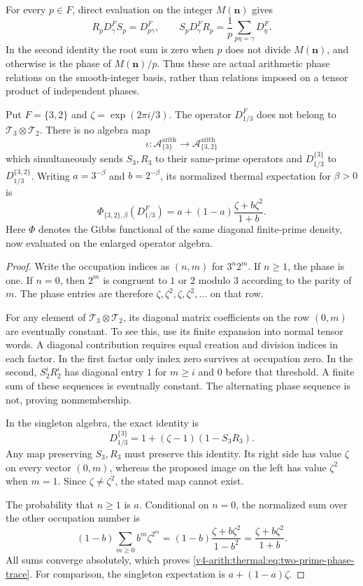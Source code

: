 For every $p\in F$, direct evaluation on the integer $M(\mathbf n)$
gives
\[
 R_pD^F_\gamma S_p=D^F_{p\gamma},\qquad
 S_pD^F_\gamma R_p=\frac1p\sum_{p\eta=\gamma}D^F_\eta.
\]
In the second identity the root sum is zero when $p$ does not
divide $M(\mathbf n)$, and otherwise is the phase of
$M(\mathbf n)/p$. Thus these are actual arithmetic phase
relations on the smooth-integer basis, rather than relations
imposed on a tensor product of independent phases.

\begin{proposition}
\label{v4-arith:thermal:prop:two-prime-phase}
Put $F=\{3,2\}$ and $\zeta=\exp(2\pi i/3)$. The operator
$D^F_{1/3}$ does not belong to $\mathcal T_3\otimes\mathcal T_2$.
There is no algebra map
\[
 \iota:\mathcal A_{\{3\}}^{\mathrm{arith}}
       \longrightarrow\mathcal A_{\{3,2\}}^{\mathrm{arith}}
\]
which simultaneously sends $S_3,R_3$ to their same-prime operators
and $D^{\{3\}}_{1/3}$ to $D^{\{3,2\}}_{1/3}$.
Writing $a=3^{-\beta}$ and $b=2^{-\beta}$, its normalized thermal
expectation for $\beta>0$ is
\begin{equation}
 \Phi_{\{3,2\},\beta}(D^F_{1/3})
   =a+(1-a)\frac{\zeta+b\zeta^2}{1+b}.
 \label{v4-arith:thermal:eq:two-prime-phase-trace}
\end{equation}
Here $\Phi$ denotes the Gibbs functional of the same diagonal
finite-prime density, now evaluated on the enlarged operator algebra.
\end{proposition}

\begin{proof}
Write the occupation indices as $(n,m)$ for $3^n2^m$. If $n\geq1$,
the phase is one. If $n=0$, then $2^m$ is congruent to $1$ or $2$
modulo $3$ according to the parity of $m$. The phase entries are
therefore $\zeta,\zeta^2,\zeta,\zeta^2,\ldots$ on that row.

For any element of $\mathcal T_3\otimes\mathcal T_2$, its diagonal
matrix coefficients on the row $(0,m)$ are eventually constant.
To see this, use its finite expansion into normal tensor words.
A diagonal contribution requires equal creation and division
indices in each factor. In the first factor only index zero
survives at occupation zero. In the second, $S_2^iR_2^i$ has
diagonal entry $1$ for $m\geq i$ and $0$ before that threshold.
A finite sum of these sequences is eventually constant.
The alternating phase sequence is not, proving nonmembership.

In the singleton algebra, the exact identity is
\[
 D^{\{3\}}_{1/3}=1+(\zeta-1)(1-S_3R_3).
\]
Any map preserving $S_3,R_3$ must preserve this identity. Its
right side has value $\zeta$ on every vector $(0,m)$, whereas
the proposed image on the left has value $\zeta^2$ when $m=1$.
Since $\zeta\ne\zeta^2$, the stated map cannot exist.

The probability that $n\geq1$ is $a$. Conditional on $n=0$,
the normalized sum over the other occupation number is
\[
 (1-b)\sum_{m\geq0}b^m\zeta^{2^m}
    =(1-b)\frac{\zeta+b\zeta^2}{1-b^2}
    =\frac{\zeta+b\zeta^2}{1+b}.
\]
All sums converge absolutely, which proves
\eqref{v4-arith:thermal:eq:two-prime-phase-trace}. For comparison, the singleton
expectation is $a+(1-a)\zeta$.
\end{proof}

